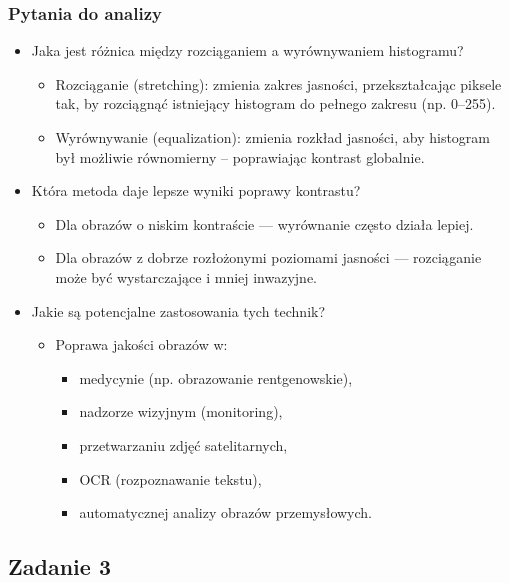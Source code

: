 \subsubsection{Pytania do analizy}

\begin{itemize}
	\item Jaka jest różnica między rozciąganiem a wyrównywaniem histogramu?
	
	\begin{itemize}
		\item Rozciąganie (stretching): zmienia zakres jasności, przekształcając piksele tak, by rozciągnąć istniejący histogram do pełnego zakresu (np. 0–255).
		\item Wyrównywanie (equalization): zmienia rozkład jasności, aby histogram był możliwie równomierny – poprawiając kontrast globalnie.
	\end{itemize}
	
	\item Która metoda daje lepsze wyniki poprawy kontrastu?
	
	\begin{itemize}
		\item Dla obrazów o niskim kontraście — wyrównanie często działa lepiej.
		\item Dla obrazów z dobrze rozłożonymi poziomami jasności — rozciąganie może być wystarczające i mniej inwazyjne.
	\end{itemize}
	
	\item Jakie są potencjalne zastosowania tych technik?
	\begin{itemize}
		\item Poprawa jakości obrazów w:
		\begin{itemize}
			\item medycynie (np. obrazowanie rentgenowskie),
			\item nadzorze wizyjnym (monitoring),
			\item przetwarzaniu zdjęć satelitarnych,
			\item OCR (rozpoznawanie tekstu),	
			\item automatycznej analizy obrazów przemysłowych.
		\end{itemize}
	\end{itemize}
\end{itemize}

\clearpage

\subsection{Zadanie 3}

